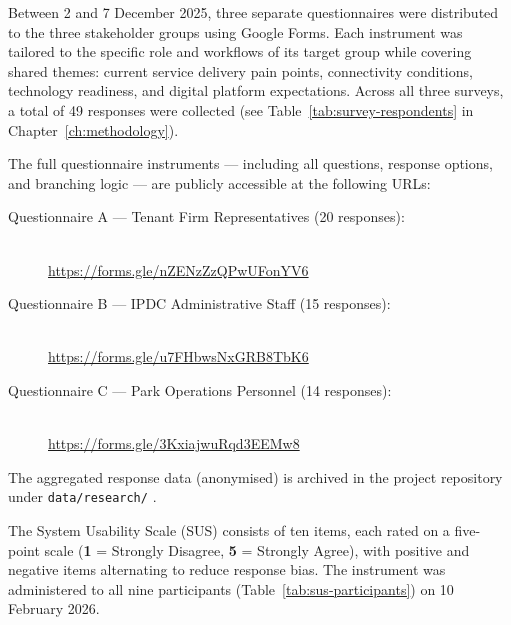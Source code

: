 \label{app:questionnaires}

Between 2 and 7 December 2025, three separate questionnaires were distributed to the three stakeholder groups using Google Forms. Each instrument was tailored to the specific role and workflows of its target group while covering shared themes: current service delivery pain points, connectivity conditions, technology readiness, and digital platform expectations. Across all three surveys, a total of 49 responses were collected (see Table~\ref{tab:survey-respondents} in Chapter~\ref{ch:methodology}).

The full questionnaire instruments --- including all questions, response options, and branching logic --- are publicly accessible at the following URLs:

\begin{description}
  \item[Questionnaire A --- Tenant Firm Representatives (20 responses):]~\\
  \url{https://forms.gle/nZENzZzQPwUFonYV6}

  \item[Questionnaire B --- IPDC Administrative Staff (15 responses):]~\\
  \url{https://forms.gle/u7FHbwsNxGRB8TbK6}

  \item[Questionnaire C --- Park Operations Personnel (14 responses):]~\\
  \url{https://forms.gle/3KxiajwuRqd3EEMw8}
\end{description}

The aggregated response data (anonymised) is archived in the project repository under \texttt{data/research/} \citep{BerhanuIPDC2025}.

\label{app:sus}

The System Usability Scale (SUS) \citep{Brooke1996} consists of ten items, each rated on a five-point scale (\textbf{1} = Strongly Disagree, \textbf{5} = Strongly Agree), with positive and negative items alternating to reduce response bias. The instrument was administered to all nine participants (Table~\ref{tab:sus-participants}) on 10 February 2026.

